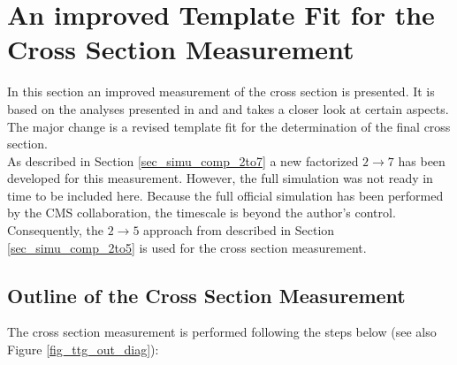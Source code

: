 \chapter{An improved Template Fit for the \ttgamma Cross Section Measurement}
\label{sec_ttg}

In this section an improved measurement of the \ttgamma cross section is presented. It is based on the analyses presented in \cite{CMS-PAS-TOP-13-011} and \cite{tholen:ma} and takes a closer look at certain aspects. The major change is a revised template fit for the determination of the final cross section.\\
As described in Section \ref{sec_simu_comp_2to7} a new factorized $2 \to 7$ has been developed for this measurement. However, the full simulation was not ready in time to be included here. Because the full official simulation has been performed by the CMS collaboration, the timescale is beyond the author's control. Consequently, the $2 \to 5$ approach from \cite{CMS-PAS-TOP-13-011} described in Section \ref{sec_simu_comp_2to5} is used for the \ttgamma cross section measurement.  \\

\section{Outline of the \ttgamma Cross Section Measurement}


The \ttgamma cross section measurement is performed following the steps below (see also Figure \ref{fig_ttg_out_diag}):\\


